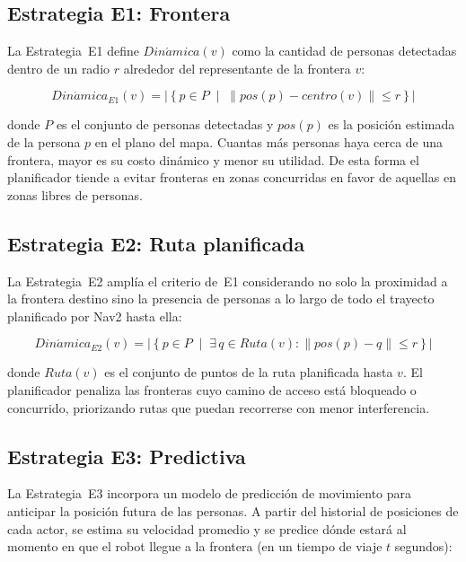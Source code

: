 \subsection{Estrategia E1: Frontera}

La Estrategia~E1 define $Din\acute{a}mica(v)$ como la cantidad de personas
detectadas dentro de un radio $r$ alrededor del representante de la frontera $v$:

\begin{equation}
    Din\acute{a}mica_{E1}(v) = \left|\left\{p \in P \;\middle|\; \|pos(p) - centro(v)\| \leq r\right\}\right|
    \label{eq:e1}
\end{equation}

donde $P$ es el conjunto de personas detectadas y $pos(p)$ es la posición
estimada de la persona $p$ en el plano del mapa. Cuantas más personas haya
cerca de una frontera, mayor es su costo dinámico y menor su utilidad. De esta
forma el planificador tiende a evitar fronteras en zonas concurridas en favor
de aquellas en zonas libres de personas.

\subsection{Estrategia E2: Ruta planificada}

La Estrategia~E2 amplía el criterio de~E1 considerando no solo la proximidad a
la frontera destino sino la presencia de personas a lo largo de todo el trayecto
planificado por Nav2 hasta ella:

\begin{equation}
    Din\acute{a}mica_{E2}(v) = \left|\left\{p \in P \;\middle|\; \exists\, q \in Ruta(v) : \|pos(p) - q\| \leq r\right\}\right|
    \label{eq:e2}
\end{equation}

donde $Ruta(v)$ es el conjunto de puntos de la ruta planificada hasta $v$.
El planificador penaliza las fronteras cuyo camino de acceso está bloqueado o
concurrido, priorizando rutas que puedan recorrerse con menor interferencia.

\subsection{Estrategia E3: Predictiva}

La Estrategia~E3 incorpora un modelo de predicción de movimiento para anticipar
la posición futura de las personas. A partir del historial de posiciones de cada
actor, se estima su velocidad promedio y se predice dónde estará al momento en
que el robot llegue a la frontera (en un tiempo de viaje $t$ segundos):

